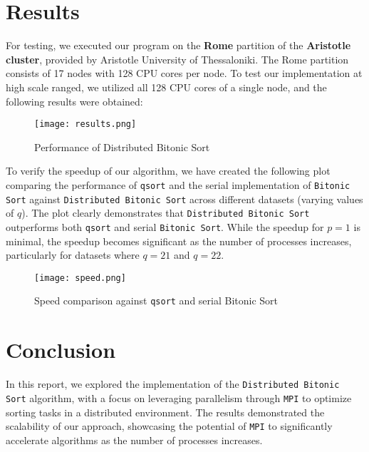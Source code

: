 \documentclass[12pt]{article}
\begin{document}
\section{Results}
For testing, we executed our program on the \textbf{Rome} partition of the \textbf{Aristotle cluster}, provided by Aristotle University of Thessaloniki. The Rome partition consists of 17 nodes with 128 CPU cores per node. To test our implementation at high scale ranged, we utilized all 128 CPU cores of a single node, and the following results were obtained:

\begin{figure}[H]
    \centering
    \texttt{[image: results.png]}
    \caption{Performance of Distributed Bitonic Sort}
    \label{fig:enter-label}
\end{figure}

To verify the speedup of our algorithm, we have created the following plot comparing the performance of \texttt{qsort} and the serial implementation of \texttt{Bitonic Sort} against \texttt{Distributed Bitonic Sort} across different datasets (varying values of \(q\)). The plot clearly demonstrates that \texttt{Distributed Bitonic Sort} outperforms both \texttt{qsort} and serial \texttt{Bitonic Sort}. While the speedup for \(p=1\) is minimal, the speedup becomes significant as the number of processes increases, particularly for datasets where \(q=21\) and \(q=22\).

\begin{figure}[H]
    \centering
    \texttt{[image: speed.png]}
    \caption{Speed comparison against \texttt{qsort} and serial Bitonic Sort}
    \label{fig:enter-label}
\end{figure}

\section{Conclusion}

In this report, we explored the implementation of the \texttt{Distributed Bitonic Sort} algorithm, with a focus on leveraging parallelism through \texttt{MPI} to optimize sorting tasks in a distributed environment. The results demonstrated the scalability of our approach, showcasing the potential of \texttt{MPI} to significantly accelerate algorithms as the number of processes increases.
\end{document}
